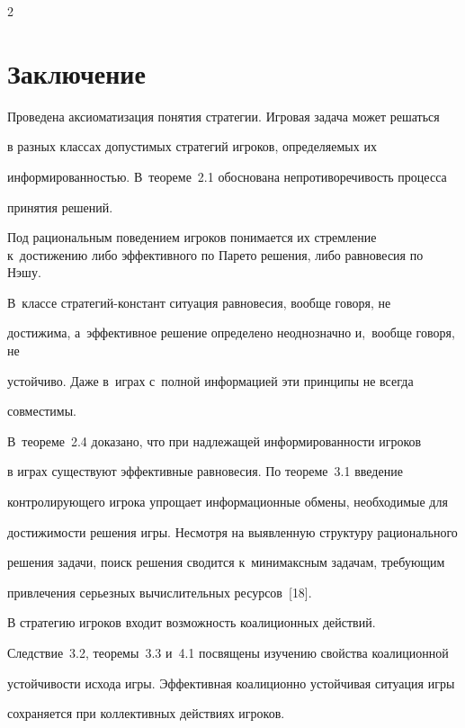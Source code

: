 \begin{multicols}{2}
\section{Заключение}



    Проведена аксиоматизация понятия стратегии. Игровая задача может решаться

в разных классах допустимых стратегий игроков, определяемых их

информированностью. В~тео\-ре\-ме~2.1 обоснована непротиворечивость процесса

принятия решений.



    Под рациональным поведением игроков понимается их стремление к~достижению либо эффективного по Парето решения, либо равновесия по Нэшу.

В~классе стра\-те\-гий-констант ситуация равновесия, вообще говоря, не

достижима, а~эффективное решение определено неоднозначно и,~вообще говоря, не

устойчиво. Даже в~играх с~полной информацией эти принципы не всегда

совместимы.

    В~тео\-ре\-ме~2.4 доказано, что при надлежащей информированности игроков

в играх существуют эффективные равновесия. По теореме~3.1 введение

контролирующего игрока упрощает информационные обмены, необходимые для

достижимости решения игры. Несмотря на выявленную структуру рационального

решения задачи, поиск решения сводится к~минимаксным задачам, требующим

привлечения серьезных вычислительных ресурсов~[18].



    В стратегию игроков входит возможность коалиционных действий.

Следствие~3.2, теоремы~3.3 и~4.1 посвящены изучению свойства коалиционной

устойчивости исхода игры. Эффективная коалиционно устойчивая ситуация игры

сохраняется при коллективных действиях игроков.



{\small\frenchspacing

 {%


}}
\end{multicols}
